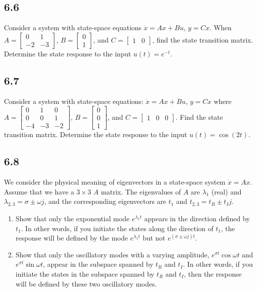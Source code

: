 \documentclass{article}
\newcommand{\problem}[2]{\subsection*{#1}}
\begin{document}
\problem{6.6}{state-response-drills}
Consider a system with state-space equations $\dot{x} = Ax + Bu$, $y = Cx$. When $A = \begin{bmatrix} 0 & 1 \\ -2 & -3 \end{bmatrix}$, $B = \begin{bmatrix} 0 \\ 1 \end{bmatrix}$, and $C = \begin{bmatrix} 1 & 0 \end{bmatrix}$, find the state transition matrix. Determine the state response to the input $u(t) = e^{-t}$.

\problem{6.7}{state-response-drills}
Consider a system with state-space equations: $\dot{x} = Ax + Bu$, $y = Cx$ where $A = \begin{bmatrix} 0 & 1 & 0 \\ 0 & 0 & 1 \\ -4 & -3 & -2 \end{bmatrix}$, $B = \begin{bmatrix} 0 \\ 0 \\ 1 \end{bmatrix}$, and $C = \begin{bmatrix} 1 & 0 & 0 \end{bmatrix}$. Find the state transition matrix. Determine the state response to the input $u(t) = \cos(2t)$.

\problem{6.8}{}
We consider the physical meaning of eigenvectors in a state-space system $\dot{x} = Ax$. Assume that we have a $3 \times 3$ $A$ matrix. The eigenvalues of $A$ are $\lambda_1$ (real) and $\lambda_{2,3} = \sigma \pm \omega j$, and the corresponding eigenvectors are $t_1$ and $t_{2,3} = t_R \pm t_I j$.
\begin{enumerate}
\item Show that only the exponential mode $e^{\lambda_1 t}$ appears in the direction defined by $t_1$. In other words, if you initiate the states along the direction of $t_1$, the response will be defined by the mode $e^{\lambda_1 t}$ but not $e^{(\sigma \pm \omega j)t}$.
\item Show that only the oscillatory modes with a varying amplitude, $e^{\sigma t}\cos\omega t$ and $e^{\sigma t}\sin\omega t$, appear in the subspace spanned by $t_R$ and $t_I$. In other words, if you initiate the states in the subspace spanned by $t_R$ and $t_I$, then the response will be defined by these two oscillatory modes.
\end{enumerate}
\end{document}
